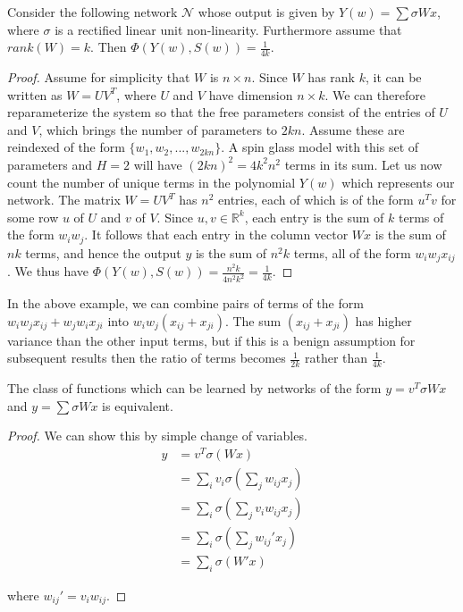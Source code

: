 \documentclass[twoside]{article}
\begin{document}
\begin{lemma}
Consider the following network $\mathcal{N}$ whose output is given by $Y(w) = \sum \sigma Wx$, where $\sigma$ is a rectified linear unit non-linearity.
Furthermore assume that $rank(W) = k$.
Then $\Phi(Y(w),S(w))  = \frac{1}{4k}$.
\end{lemma}

\begin{proof}
 Assume for simplicity that $W$ is $n \times n$. Since $W$ has rank $k$, it can be written as $W = UV^T$, where $U$ and $V$ have dimension $n \times k$.
 We can therefore reparameterize the system so that the free parameters consist of the entries of $U$ and $V$, which brings the number of parameters to $2kn$. 
 Assume these are reindexed of the form $\{w_1,w_2,...,w_{2kn} \}$.
 A spin glass model with this set of parameters and $H=2$ will have $(2kn)^2=4k^2n^2$ terms in its sum.
 Let us now count the number of unique terms in the polynomial $Y(w)$ which represents our network. 
 The matrix $W = UV^T$ has $n^2$ entries, each of which is of the form $u^Tv$ for some row $u$ of $U$ and $v$ of $V$. 
 Since $u,v \in \mathbb{R}^k$, each entry is the sum of $k$ terms of the form $w_i w_j$. 
 It follows that each entry in the column vector $Wx$ is the sum of $nk$ terms, and hence the output $y$ is the sum of $n^2k$ terms, all of the form $w_iw_jx_{ij}$.
 We thus have $\Phi(Y(w),S(w)) = \frac{n^2k}{4n^2k^2} = \frac{1}{4k}$.
\end{proof}

  In the above example, we can combine pairs of terms of the form $w_iw_jx_{ij} + w_jw_ix_{ji}$ into $w_iw_j(x_{ij}+x_{ji})$. 
  The sum $(x_{ij}+x_{ji})$ has higher variance than the other input terms, but if this is a benign assumption for subsequent results then the ratio of terms becomes $\frac{1}{2k}$ rather than $\frac{1}{4k}$.


\begin{lemma}
 The class of functions which can be learned by networks of the form $y = v^T \sigma Wx$ and $y = \sum \sigma Wx$ is equivalent. 
\end{lemma}

\begin{proof}
 We can show this by simple change of variables. 
 \begin{align*}
  y &= v^T \sigma(Wx) \\
  &= \sum_i v_i \sigma(\sum_j w_{ij} x_j) \\
  &= \sum_i \sigma(\sum_j v_i w_{ij} x_j) \\
  &= \sum_i \sigma(\sum_j w_{ij}' x_j) \\
  &= \sum_i \sigma(W'x)
 \end{align*}
 
 where $w_{ij}' = v_i w_{ij}$.
\end{proof}
\end{document}

